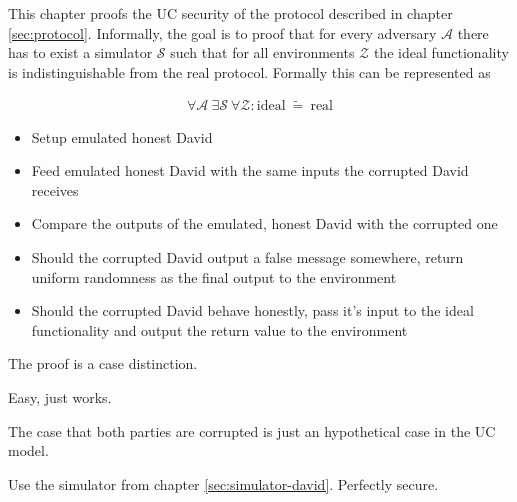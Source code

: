 \label{sec:security}

This chapter proofs the UC \cite{canetti05} security of the protocol described
in chapter \ref{sec:protocol}. Informally, the goal is to proof that for every
adversary $\mathcal{A}$ there has to exist a simulator $\mathcal{S}$ such that
for all environments $\mathcal{Z}$ the ideal functionality is indistinguishable
from the real protocol. Formally this can be represented as

\begin{align*}
%
\forall \mathcal{A}\ \exists \mathcal{S}\ \forall \mathcal{Z} :
\text{ideal}\ \widetilde{=}\ \text{real}
%
\end{align*}

%
%
\label{sec:simulators}


\label{sec:simulator-david}

\begin{itemize}

\item Setup emulated honest David

\item Feed emulated honest David with the same inputs the corrupted David
receives

\item Compare the outputs of the emulated, honest David with the corrupted one

\item Should the corrupted David output a false message somewhere, return
uniform randomness as the final output to the environment

\item Should the corrupted David behave honestly, pass it's input to the ideal
functionality and output the return value to the environment

\end{itemize}



%
%
\label{sec:proof}

The proof is a case distinction.



Easy, just works.




The case that both parties are corrupted is just an hypothetical case in the UC
model.



Use the simulator from chapter \ref{sec:simulator-david}. Perfectly secure.



